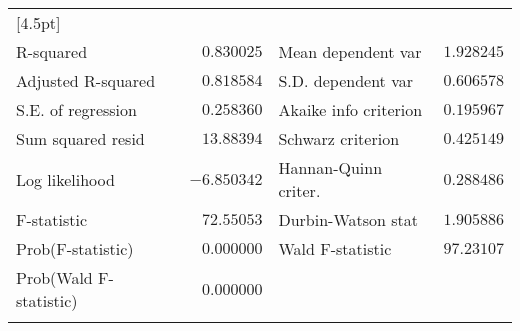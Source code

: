 \begin{tabular}{lrrrr}
[4.5pt] \hline \\ [-4.5pt]
\multicolumn{1}{l}{R-squared}&\multicolumn{1}{r}{$0.830025$}&\multicolumn{2}{l}{Mean dependent var}&\multicolumn{1}{r}{$1.928245$}\\
\multicolumn{1}{l}{Adjusted R-squared}&\multicolumn{1}{r}{$0.818584$}&\multicolumn{2}{l}{S.D. dependent var}&\multicolumn{1}{r}{$0.606578$}\\
\multicolumn{1}{l}{S.E. of regression}&\multicolumn{1}{r}{$0.258360$}&\multicolumn{2}{l}{Akaike info criterion}&\multicolumn{1}{r}{$0.195967$}\\
\multicolumn{1}{l}{Sum squared resid}&\multicolumn{1}{r}{$13.88394$}&\multicolumn{2}{l}{Schwarz criterion}&\multicolumn{1}{r}{$0.425149$}\\
\multicolumn{1}{l}{Log likelihood}&\multicolumn{1}{r}{$-6.850342$}&\multicolumn{2}{l}{Hannan-Quinn criter.}&\multicolumn{1}{r}{$0.288486$}\\
\multicolumn{1}{l}{F-statistic}&\multicolumn{1}{r}{$72.55053$}&\multicolumn{2}{l}{Durbin-Watson stat}&\multicolumn{1}{r}{$1.905886$}\\
\multicolumn{1}{l}{Prob(F-statistic)}&\multicolumn{1}{r}{$0.000000$}&\multicolumn{2}{l}{Wald F-statistic}&\multicolumn{1}{r}{$97.23107$}\\
\multicolumn{1}{l}{Prob(Wald F-statistic)}&\multicolumn{1}{r}{$0.000000$}&\multicolumn{1}{c}{}&\multicolumn{1}{c}{}&\multicolumn{1}{c}{}\\
[4.5pt] \hline \\ [-4.5pt]
\end{tabular}
